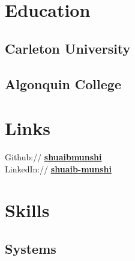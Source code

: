 \documentclass[letterpaper]{deedy-resume} %
\begin{document}
\begin{minipage}[t]{0.33\textwidth} %


\section{Education} 

\subsection{Carleton University}

\sectionspace %

\subsection{Algonquin College}


\sectionspace %


\section{Links} 

Github:// \href{https://github.com/shuaibmunshi}{\bf shuaibmunshi} \\
LinkedIn:// \href{https://www.linkedin.com/in/shuaib-munshi/}{\bf shuaib-munshi}


\sectionspace %

\section{Skills}

\subsection{Systems}


\end{minipage}
\end{document}
